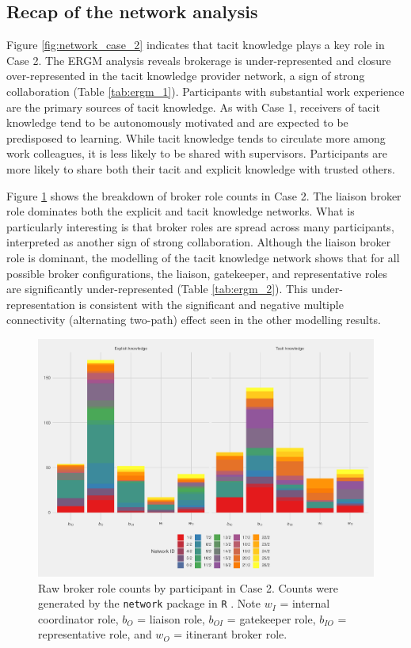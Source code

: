 \subsection{Recap of the network analysis}

Figure \ref{fig:network_case_2} indicates that tacit knowledge plays a key role in Case 2. The ERGM analysis reveals brokerage is under-represented and closure over-represented in the tacit knowledge provider network, a sign of strong collaboration (Table \ref{tab:ergm_1}). Participants with substantial work experience are the primary sources of tacit knowledge. As with Case 1, receivers of tacit knowledge tend to be autonomously motivated and are expected to be predisposed to learning. While tacit knowledge tends to circulate more among work colleagues, it is less likely to be shared with supervisors. Participants are more likely to share both their tacit and explicit knowledge with trusted others. \medskip

Figure \ref{fig:gf_c2} shows the breakdown of broker role counts in Case 2. The liaison broker role dominates both the explicit and tacit knowledge networks. What is particularly interesting is that broker roles are spread across many participants, interpreted as another sign of strong collaboration. Although the liaison broker role is dominant, the modelling of the tacit knowledge network shows that for all possible broker configurations, the liaison, gatekeeper, and representative roles are significantly under-represented (Table \ref{tab:ergm_2}). This under-representation is consistent with the significant and negative multiple connectivity (alternating two-path) effect seen in the other modelling results.

\begin{figure}
\centering
\includegraphics[width = \textwidth]{Images/gf_case2.pdf}
\caption[Raw broker role counts by participant in Case 2]{Raw broker role counts by participant in Case 2. Counts were generated by the \texttt{network} package in \texttt{R} \citep{butts2008social}. Note $w_I$ = internal coordinator role, $b_O$ = liaison role, $b_{OI}$ = gatekeeper role, $b_{IO}$ = representative role, and $w_O$ = itinerant broker role.}
\label{fig:gf_c2}
\end{figure}

